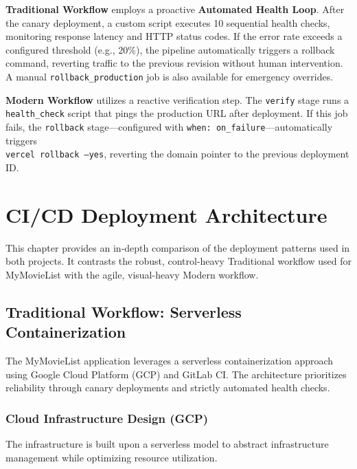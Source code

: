 \documentclass[a4paper,12pt]{report}
\begin{document}
\textbf{Traditional Workflow} employs a proactive \textbf{Automated Health Loop}. After the canary deployment, a custom script executes 10 sequential health checks, monitoring response latency and HTTP status codes. If the error rate exceeds a configured threshold (e.g., 20\%), the pipeline automatically triggers a rollback command, reverting traffic to the previous revision without human intervention. A manual \texttt{rollback\_production} job is also available for emergency overrides.

\textbf{Modern Workflow} utilizes a reactive verification step. The \texttt{verify} stage runs a \\ \texttt{health\_check} script that pings the production URL after deployment. If this job fails, the \texttt{rollback} stage—configured with \texttt{when: on\_failure}—automatically triggers \\ \texttt{vercel rollback --yes}, reverting the domain pointer to the previous deployment ID.


\chapter{CI/CD Deployment Architecture}

This chapter provides an in-depth comparison of the deployment patterns used in both projects. It contrasts the robust, control-heavy Traditional workflow used for MyMovieList with the agile, visual-heavy Modern workflow.

\section{Traditional Workflow: Serverless Containerization}

The MyMovieList application leverages a serverless containerization approach using Google Cloud Platform (GCP) and GitLab CI. The architecture prioritizes reliability through canary deployments and strictly automated health checks.

\subsection{Cloud Infrastructure Design (GCP)}
The infrastructure is built upon a serverless model to abstract infrastructure management while optimizing resource utilization.
\end{document}
